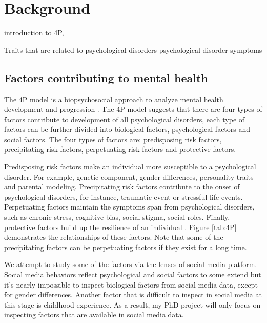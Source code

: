 
\chapter{Background}

introduction to 4P, 

Traits that are related to psychological disorders
psychological disorder symptoms

\section{Factors contributing to mental health}
The 4P model is a biopsychosocial approach to analyze mental health development and progression \cite{}. The 4P model suggests that there are four types of factors contribute to development of all psychological disorders, each type of factors can be further divided into biological factors, psychological factors and social factors. The four types of factors are: predisposing risk factors, precipitating risk factors, perpetuating risk factors and protective factors. 

Predisposing risk factors make an individual more susceptible to a psychological disorder. For example, genetic component, gender differences, personality traits and parental modeling. Precipitating risk factors contribute to the onset of psychological disorders, for instance, traumatic event or stressful life events. Perpetuating factors maintain the symptoms span from psychological disorders, such as chronic stress, cognitive bias, social stigma, social roles. Finally, protective factors build up the resilience of an individual \cite{}. Figure \ref{tab:4P} demonstrates the relationships of these factors. Note that some of the precipitating factors can be perpetuating factors if they exist for a long time. 

We attempt to study some of the factors via the lenses of social media platform. Social media behaviors reflect psychological and social factors to some extend but it's nearly impossible to inspect biological factors from social media data, except for gender differences. Another factor that is difficult to inspect in social media at this stage is childhood experience. As a result, my PhD project will only focus on inspecting factors that are available in social media data.

